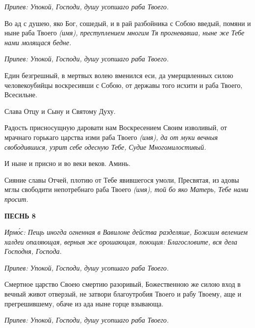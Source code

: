  \itshape Припев:\normalfont{} Упокой, Господи, душу усопшаго раба Твоего.



   Во ад с душею, яко Бог, сошедый, и в рай разбойника с Собою введый,
помяни и ныне раба Твоего \itshape  (имя)\normalfont{}, преступлением многим Тя прогневавша,
ныне же Тебе нами молящася бедне.



 \itshape Припев:\normalfont{} Упокой, Господи, душу усопшаго раба Твоего.



   Един безгрешный, в мертвых волею вменился еси, да умерщвленных
силою человекоубийцы воскресивши с Собою, от державы того исхити и раба
Твоего, Всесильне.



   Слава Отцу и Сыну и Святому Духу.



   Радость присносущную даровати нам Воскресением Своим изволивый, от
мрачнаго горькаго царства изми раба Твоего \itshape  (имя)\normalfont{}, да от муки вечныя
свободившися, узрит себе одесную Тебе, Судие Многомилостивый.



   И ныне и присно и во веки веков. Аминь.



   Сияние славы Отчей, плотию от Тебе явившегося умоли, Пресвятая, из
адовы мглы свободити непотребнаго раба Твоего \itshape  (имя)\normalfont{}, той бо яко Матерь,
Тебе нами просит.



 

\bfseries ПЕСНЬ 8\normalfont{}


 \itshape Ирмо́с:\normalfont{} Пещь иногда огненная в Вавилоне действа разделяше, Божиим велением
халдеи опаляющая, верныя же орошающая, поющия: Благословите, вся дела
Господня, Господа.



 \itshape Припев:\normalfont{} Упокой, Господи, душу усопшаго раба Твоего.



   Смертное царство Своею смертию разоривый, Божественною же силою
вход в вечный живот отверзый, не затвори благоутробия Твоего и рабу
Твоему, аще и прегрешившему, обаче из ада ныне горце взывающа.




 \itshape Припев:\normalfont{} Упокой, Господи, душу усопшаго раба Твоего.



